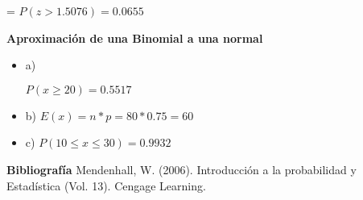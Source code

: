\documentclass{oxmathproblems}
\begin{document}
\begin{questions}
\begin{itemize}
= 
$ P(z > 1.5076) = 0.0655 $

\end{itemize}

\miquestion \textbf {Aproximación de una Binomial a una normal}
\begin{itemize}
\item  a) 

$ P (x \geq 20 ) = 0.5517$ 

\item  b)  $ E(x) = n * p = 80 *0.75 = 60 $ 
\item  c)
$ P(10 \leq x \leq 30 ) = 0.9932 $ 
\end{itemize}


\end{questions}

\textbf{Bibliografía}
Mendenhall, W. (2006). Introducción a la probabilidad y Estadística (Vol. 13). Cengage Learning.
\end{document}
